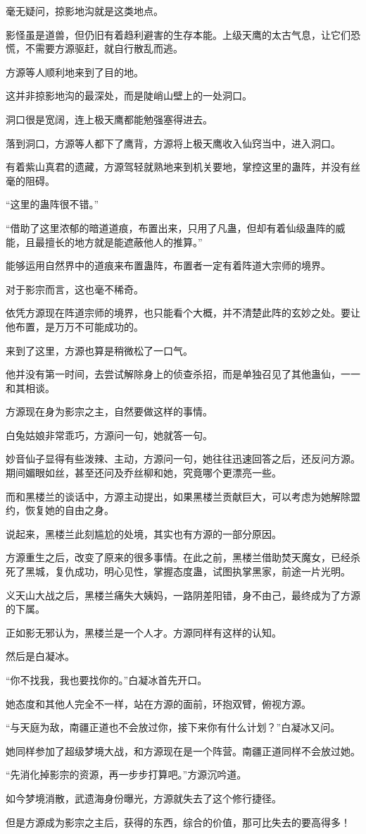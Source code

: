 \begin{this_body}
毫无疑问，掠影地沟就是这类地点。

影怪虽是道兽，但仍旧有着趋利避害的生存本能。上级天鹰的太古气息，让它们恐慌，不需要方源驱赶，就自行散乱而逃。

方源等人顺利地来到了目的地。

这并非掠影地沟的最深处，而是陡峭山壁上的一处洞口。

洞口很是宽阔，连上极天鹰都能勉强塞得进去。

落到洞口，方源等人都下了鹰背，方源将上极天鹰收入仙窍当中，进入洞口。

有着紫山真君的遗藏，方源驾轻就熟地来到机关要地，掌控这里的蛊阵，并没有丝毫的阻碍。

“这里的蛊阵很不错。”

“借助了这里浓郁的暗道道痕，布置出来，只用了凡蛊，但却有着仙级蛊阵的威能，且最擅长的地方就是能遮蔽他人的推算。”

能够运用自然界中的道痕来布置蛊阵，布置者一定有着阵道大宗师的境界。

对于影宗而言，这也毫不稀奇。

依凭方源现在阵道宗师的境界，也只能看个大概，并不清楚此阵的玄妙之处。要让他布置，是万万不可能成功的。

来到了这里，方源也算是稍微松了一口气。

他并没有第一时间，去尝试解除身上的侦查杀招，而是单独召见了其他蛊仙，一一和其相谈。

方源现在身为影宗之主，自然要做这样的事情。

白兔姑娘非常乖巧，方源问一句，她就答一句。

妙音仙子显得有些泼辣、主动，方源问一句，她往往迅速回答之后，还反问方源。期间媚眼如丝，甚至还问及乔丝柳和她，究竟哪个更漂亮一些。

而和黑楼兰的谈话中，方源主动提出，如果黑楼兰贡献巨大，可以考虑为她解除盟约，恢复她的自由之身。

说起来，黑楼兰此刻尴尬的处境，其实也有方源的一部分原因。

方源重生之后，改变了原来的很多事情。在此之前，黑楼兰借助焚天魔女，已经杀死了黑城，复仇成功，明心见性，掌握态度蛊，试图执掌黑家，前途一片光明。

义天山大战之后，黑楼兰痛失大姨妈，一路阴差阳错，身不由己，最终成为了方源的下属。

正如影无邪认为，黑楼兰是一个人才。方源同样有这样的认知。

然后是白凝冰。

“你不找我，我也要找你的。”白凝冰首先开口。

她态度和其他人完全不一样，站在方源的面前，环抱双臂，俯视方源。

“与天庭为敌，南疆正道也不会放过你，接下来你有什么计划？”白凝冰又问。

她同样参加了超级梦境大战，和方源现在是一个阵营。南疆正道同样不会放过她。

“先消化掉影宗的资源，再一步步打算吧。”方源沉吟道。

如今梦境消散，武遗海身份曝光，方源就失去了这个修行捷径。

但是方源成为影宗之主后，获得的东西，综合的价值，那可比失去的要高得多！

\end{this_body}


